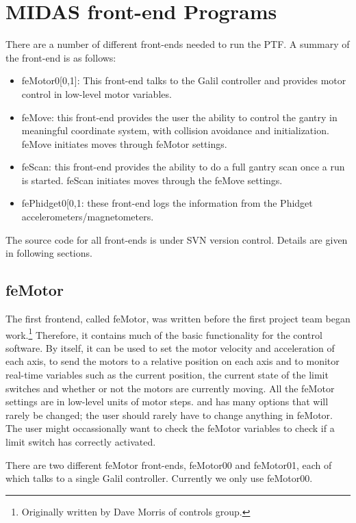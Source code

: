 \documentclass[a4paper,12pt]{article}
\begin{document}
\section{MIDAS front-end Programs}

There are a number of different front-ends needed to run the PTF.  A summary of the front-end is
as follows:

\begin{itemize}
\item feMotor0[0,1]: This front-end talks to the Galil controller and provides motor control in 
low-level motor variables.
\item feMove: this front-end provides the user the ability to control the gantry in meaningful
coordinate system, with collision avoidance and initialization.  feMove initiates moves through
feMotor settings.
\item feScan: this front-end provides the ability to do a full gantry scan once a run is started.
feScan initiates moves through the feMove settings.
\item fePhidget0[0,1: these front-end logs the information from the Phidget accelerometers/magnetometers.
\end{itemize}

The source code for all front-ends is under SVN version control.
Details are given in following sections. 

\subsection{feMotor}



The first frontend, called feMotor, was written before the first project team began 
work.\footnote{Originally written by Dave Morris of controls group.}
Therefore, it contains much of the basic functionality for the control software. By itself, 
it can be used to set the motor velocity and acceleration of each axis, to send the motors 
to a relative position on each axis and to monitor real-time variables such as the current 
position, the current state of the limit switches and whether or not the motors are currently 
moving. 
All the feMotor settings are in low-level units of motor steps.
and has many options that will rarely be changed; the user should rarely have to change anything
in feMotor.
The user might occassionally want to check the feMotor variables to check if a limit switch 
has correctly activated.

There are two different feMotor front-ends, feMotor00 and feMotor01, each of which talks
to a single Galil controller.  Currently we only use feMotor00.
\end{document}
